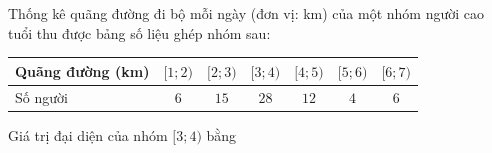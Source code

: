 \begin{ex}
Thống kê quãng đường đi bộ mỗi ngày (đơn vị: km) của một nhóm người cao tuổi thu được bảng số liệu ghép nhóm sau:
\begin{center}\small\begin{tabular}{|l|c|c|c|c|c|c|}\hline
Quãng đường (km) & $[1;2)$ & $[2;3)$ & $[3;4)$ & $[4;5)$ & $[5;6)$ & $[6;7)$\\\hline
Số người & $6$ & $15$ & $28$ & $12$ & $4$ & $6$\\\hline
\end{tabular}\end{center}
Giá trị đại diện của nhóm $[3;4)$ bằng
\loigiai{Giá trị đại diện của nhóm $[3;4)$ là $\dfrac{3+4}2=3{,}5$.}
\end{ex}

